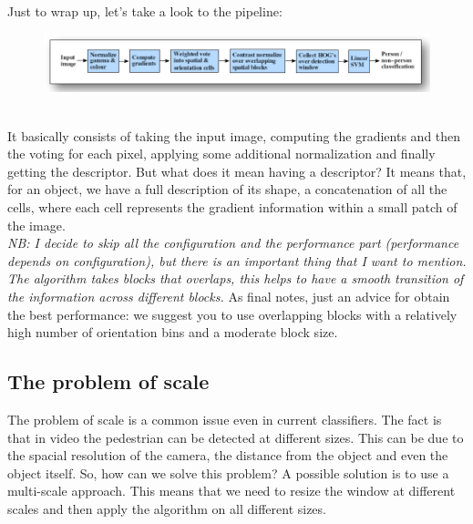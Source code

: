 \\Just to wrap up, let's take a look to the pipeline:
\begin{figure}[h]
    \centering
    \includegraphics[scale=0.45]{Figures/HOG_Pipeline.png}
\end{figure}
\\It basically consists of taking the input image, computing the gradients and then the voting for each pixel, applying some additional normalization and finally getting the descriptor.
But what does it mean having a descriptor? It means that, for an object, we have a full description of its shape, a concatenation of all the cells, where each cell represents the gradient information within a small patch of the image.
\\\textit{NB: I decide to skip all the configuration and the performance part (performance depends on configuration), but there is an important thing that I want to mention. The algorithm takes blocks that overlaps, this helps to have a smooth transition of the information across different blocks.}
As final notes, just an advice for obtain the best performance: we suggest you to use overlapping blocks with a relatively high number of orientation bins and a moderate block size.
\subsection{The problem of scale}
The problem of scale is a common issue even in current classifiers. The fact is that in video the pedestrian can be detected at different sizes.
This can be due to the spacial resolution of the camera, the distance from the object and even the object itself.
So, how can we solve this problem? A possible solution is to use a multi-scale approach. This means that we need to resize the window at different scales and then apply the algorithm on all different sizes.
